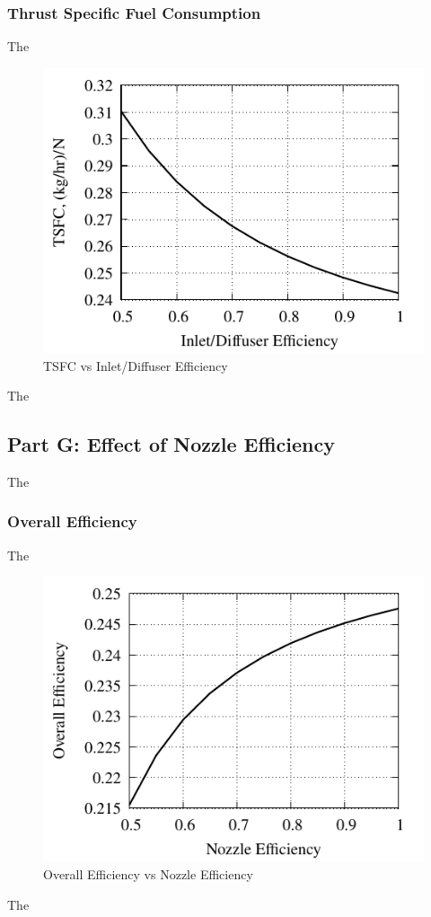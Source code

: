 \documentclass[conf]{new-aiaa} %
\begin{document}
\subsubsection{Thrust Specific Fuel Consumption}
The

\begin{figure}[hbt!] %
    \centering
    \includegraphics[]{media/performance_parameter_files/part_f_TSFC.pdf}
    \caption{\label{fig:partftsfc}TSFC vs Inlet/Diffuser Efficiency}
\end{figure}
The

\subsection{Part G: Effect of Nozzle Efficiency}
The

\subsubsection{Overall Efficiency}
The

\begin{figure}[hbt!] %
    \centering
    \includegraphics[]{media/performance_parameter_files/part_g_eta_o.pdf}
    \caption{\label{fig:partgetao}Overall Efficiency vs Nozzle Efficiency}
\end{figure}
The
\end{document}
